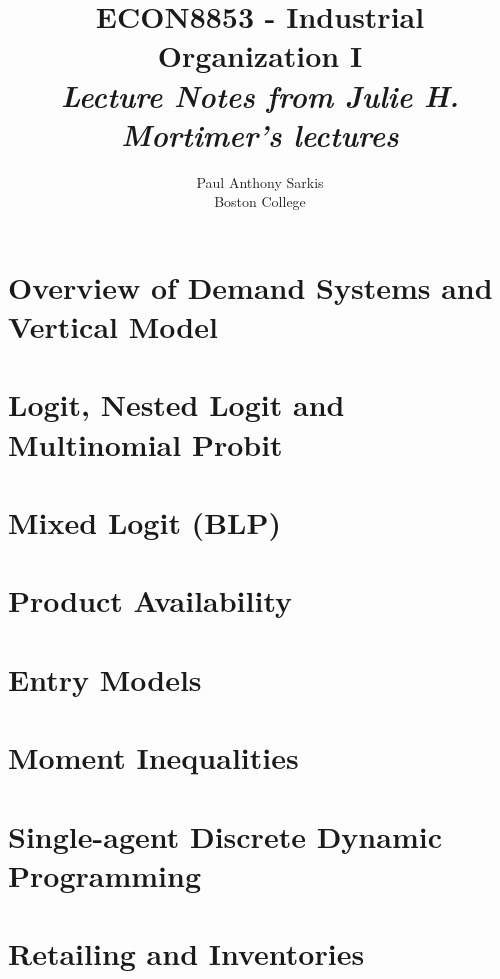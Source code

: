 \documentclass[12pt]{report}
\begin{document}
\date{}
\title{\textbf{\huge{ECON8853 - Industrial Organization I}}\\ \textit{Lecture Notes from Julie H. Mortimer's lectures}}
\author{Paul Anthony Sarkis\\ Boston College} 
 
\maketitle

\tableofcontents

\setlength{\parskip}{1em}

\chapter{Overview of Demand Systems and Vertical Model}


\chapter{Logit, Nested Logit and Multinomial Probit}


\chapter{Mixed Logit (BLP)}


\chapter{Product Availability}


\chapter{Entry Models}


\chapter{Moment Inequalities}


\chapter{Single-agent Discrete Dynamic Programming}


\chapter{Retailing and Inventories}

\end{document}
